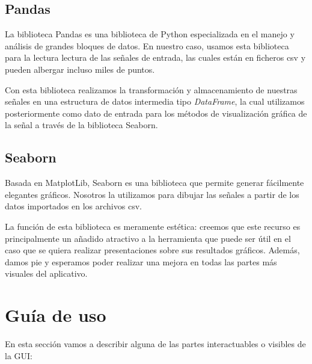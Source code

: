  
 
\subsection{Pandas}
La biblioteca Pandas es una biblioteca de Python especializada en el manejo y análisis de grandes bloques de datos. En nuestro caso, usamos esta biblioteca para la lectura lectura de las señales de entrada, las cuales están en ficheros csv y pueden albergar incluso miles de puntos.

Con esta biblioteca realizamos la transformación y almacenamiento de nuestras señales en una estructura de datos intermedia tipo \textit{DataFrame}, la cual utilizamos posteriormente como dato de entrada para los métodos de visualización gráfica de la señal a través de la biblioteca Seaborn.
 
 

\subsection{Seaborn} 
Basada en MatplotLib, Seaborn es una biblioteca que permite generar fácilmente elegantes gráficos. Nosotros la utilizamos para dibujar las señales a partir de los datos importados en los archivos csv.

La función de esta biblioteca es meramente estética: creemos que este recurso es principalmente un añadido atractivo a la herramienta que puede ser útil en el caso que se quiera realizar presentaciones sobre sus resultados gráficos. Además, damos pie y esperamos poder realizar una mejora en todas las partes más visuales del aplicativo.
 
 

\section{Guía de uso}
En esta sección vamos a describir alguna de las partes interactuables o visibles de la GUI:

